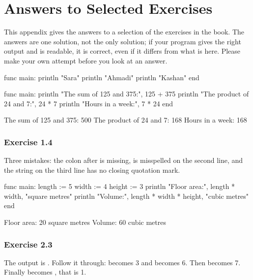 \chapter{Answers to Selected Exercises}\label{app:solutions}

This appendix gives the answers to a selection of the exercises in the book.
The answers are one solution, not the only solution; if your program gives
the right output and is readable, it is correct, even if it differs from
what is here. Please make your own attempt before you look at an answer.


\begin{salamcode}
func main:
    println "Sara"
    println "Ahmadi"
    println "Kashan"
end
\end{salamcode}

\begin{salamcode}
func main:
    println "The sum of 125 and 375:", 125 + 375
    println "The product of 24 and 7:", 24 * 7
    println "Hours in a week:", 7 * 24
end
\end{salamcode}
\begin{salamout}
The sum of 125 and 375: 500
The product of 24 and 7: 168
Hours in a week: 168
\end{salamout}

\subsection*{Exercise 1.4}
Three mistakes: the colon after  is missing, 
is misspelled on the second line, and the string on the third line has no
closing quotation mark.


\begin{salamcode}
func main:
    length := 5
    width := 4
    height := 3
    println "Floor area:", length * width, "square metres"
    println "Volume:", length * width * height, "cubic metres"
end
\end{salamcode}
\begin{salamout}
Floor area: 20 square metres
Volume: 60 cubic metres
\end{salamout}

\subsection*{Exercise 2.3}
The output is . Follow it through:  becomes 3 and
 becomes 6. Then  becomes 7. Finally  becomes
, that is 1.

